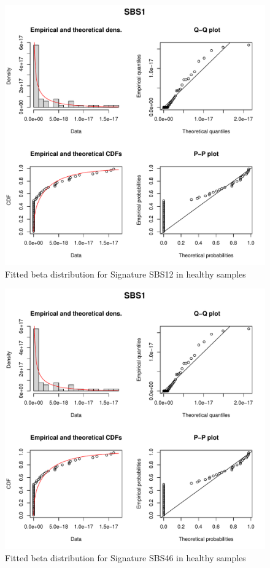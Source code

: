 \begin{figure}[ht]
\centering
\includegraphics[width=.99\linewidth, page=16]{Figures/MisMatchFinder/signatureFittedDists.pdf}
\caption[Fitted beta distribution for Signature SBS12 in healthy samples]{Fitted beta distribution for Signature SBS12 in healthy samples}\label{A:fig:fittedDistsSBS12}
\end{figure}




\begin{figure}[ht]
\centering
\includegraphics[width=.99\linewidth, page=51]{Figures/MisMatchFinder/signatureFittedDists.pdf}
\caption[Fitted beta distribution for Signature SBS46 in healthy samples]{Fitted beta distribution for Signature SBS46 in healthy samples}\label{A:fig:fittedDistsSBS46}
\end{figure}



